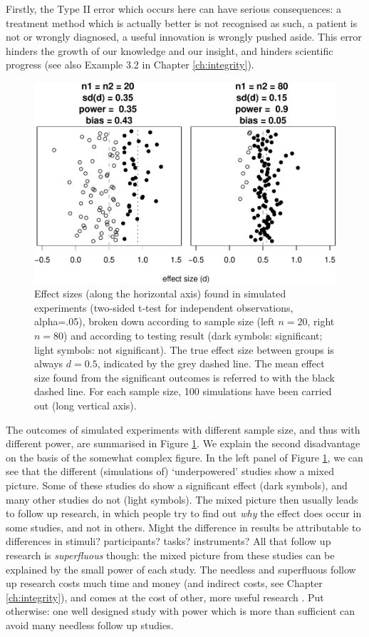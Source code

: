 \documentclass[
]{book}
\begin{document}
Firstly, the Type II error which occurs here can have serious consequences:
a treatment method which is actually better is not recognised as such,
a patient is not or wrongly diagnosed, a useful innovation is wrongly pushed
aside. This error hinders the growth of our knowledge and our insight, and hinders
scientific progress (see also
Example 3.2 in Chapter \ref{ch:integrity}).

\begin{figure}
\centering
\includegraphics{QMS-EN_files/figure-latex/underpoweredeffectsizes-1.pdf}
\caption{\label{fig:underpoweredeffectsizes}Effect sizes (along the horizontal axis) found in simulated experiments (two-sided t-test for independent observations, alpha=.05), broken down according to sample size (left \(n=20\), right \(n=80\)) and according to testing result (dark symbols: significant; light symbols: not significant). The true effect size between groups is always \(d=0.5\), indicated by the grey dashed line. The mean effect size found from the significant outcomes is referred to with the black dashed line. For each sample size, 100 simulations have been carried out (long vertical axis).}
\end{figure}

The outcomes of simulated experiments with different
sample size, and thus with different power, are summarised
in Figure \ref{fig:underpoweredeffectsizes}. We explain the second disadvantage on the basis of
the somewhat complex figure. In the left panel of Figure
\ref{fig:underpoweredeffectsizes}, we can see that the different
(simulations of) `underpowered' studies show a mixed
picture. Some of these studies do show a significant effect (dark symbols),
and many other studies do not (light symbols).
The mixed picture then usually leads to follow up research, in which
people try to find out \emph{why} the effect does occur in some studies,
and not in others. Might the difference in results be attributable
to differences in stimuli? participants? tasks?
instruments? All that follow up research is \emph{superfluous} though: the mixed
picture from these studies can be explained by the small
power of each study. The needless and superfluous follow up research
costs much time and money (and indirect costs,
see Chapter \ref{ch:integrity}), and comes at the cost of other, more useful
research \citep[p.118]{Schm96}. Put otherwise: one well designed study
with power which is more than sufficient can avoid many needless follow up studies.
\end{document}

